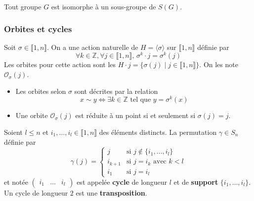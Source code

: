 
  \begin{theorem}[Cayley]
    Tout groupe $G$ est isomorphe à un sous-groupe de $S(G)$.
  \end{theorem}

  \subsubsection{Orbites et cycles}


  \begin{definition}
    Soit $\sigma \in \llbracket 1, n \rrbracket$. On a une action naturelle de $H = \langle \sigma \rangle$ sur $\llbracket 1, n \rrbracket$ définie par
    \[ \forall k \in \mathbb{Z}, \forall j \in \llbracket 1, n \rrbracket, \, \sigma^k \cdot j = \sigma^k(j) \]
    Les orbites pour cette action sont les $H \cdot j = \{ \sigma(j) \mid j \in \llbracket 1, n \rrbracket \}$. On les note $\mathcal{O}_\sigma(j)$.
  \end{definition}

  \begin{remark}
    \begin{itemize}
      \item Les orbites selon $\sigma$ sont décrites par la relation
      \[ x \sim y \iff \exists k \in \mathbb{Z} \text{ tel que } y = \sigma^k(x) \]
      \item Une orbite $\mathcal{O}_\sigma(j)$ est réduite à un point si et seulement si $\sigma(j) = j$.
    \end{itemize}
  \end{remark}


  \begin{definition}
    Soient $l \leq n$ et $i_1, \dots, i_l \in \llbracket 1, n \rrbracket$ des éléments distincts. La permutation $\gamma \in S_n$ définie par
    \[
    \gamma(j) =
    \begin{cases}
      j &\text{si } j \notin \{ i_1, \dots, i_l \} \\
      i_{k+1} &\text{si } j = i_k \text{ avec } k<l \\
      i_1 &\text{si } j=i_l
    \end{cases}
    \]
    et notée $\begin{pmatrix} i_1 & \dots & i_l \end{pmatrix}$ est appelée \textbf{cycle} de longueur $l$ et de \textbf{support} $\{ i_1, \dots, i_l \}$. Un cycle de longueur $2$ est une \textbf{transposition}.
  \end{definition}

